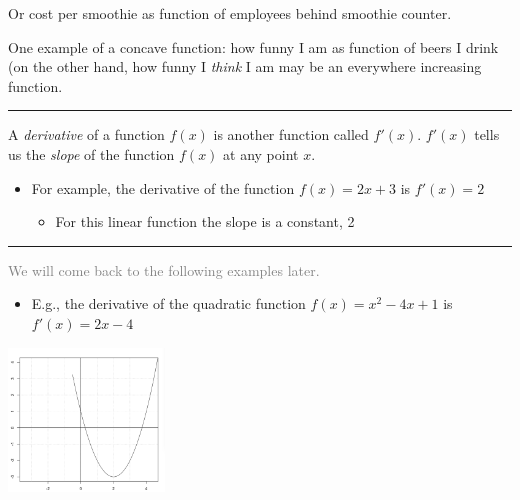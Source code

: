 \documentclass[]{article}
\providecommand{\tightlist}{%
  \setlength{\itemsep}{0pt}\setlength{\parskip}{0pt}}
\begin{document}
Or cost per smoothie as function of employees behind smoothie counter.

One example of a concave function: how funny I am as function of beers I
drink (on the other hand, how funny I \emph{think} I am may be an
everywhere increasing function.

\begin{center}\rule{0.5\linewidth}{\linethickness}\end{center}

\begin{description}
\tightlist
\item[Derivative of a function]
A \emph{derivative} of a function \(f(x)\) is another function called
\(f'(x)\). \(f'(x)\) tells us the \emph{slope} of the function \(f(x)\)
at any point \(x\).
\end{description}

\begin{itemize}
\tightlist
\item
  For example, the derivative of the function \(f(x) = 2x + 3\) is
  \(f'(x) = 2\)

  \begin{itemize}
  \tightlist
  \item
    For this linear function the slope is a constant, 2
  \end{itemize}
\end{itemize}

\begin{center}\rule{0.5\linewidth}{\linethickness}\end{center}

\textcolor{gray}{We will come back to the following examples later.}

\begin{itemize}
\tightlist
\item
  E.g., the derivative of the quadratic function \(f(x) = x^2 -4x + 1\)
  is \(f'(x) = 2x - 4\)
\end{itemize}

\bigskip

\includegraphics[height=1.5in]{picsfigs/plotaquadfncnR.png}
\end{document}
